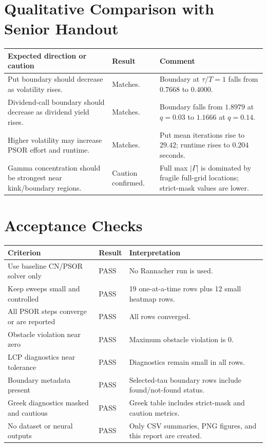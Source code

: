 \documentclass[11pt,a4paper]{article}
\begin{document}
\section{Qualitative Comparison with Senior Handout}

\begin{longtable}{L{0.34\textwidth} L{0.18\textwidth} L{0.34\textwidth}}
\toprule
Expected direction or caution & Result & Comment \\
\midrule
\endhead
Put boundary should decrease as volatility rises. & Matches. & Boundary at \(\tau/T=1\) falls from \(0.7668\) to \(0.4000\). \\
Dividend-call boundary should decrease as dividend yield rises. & Matches. & Boundary falls from \(1.8979\) at \(q=0.03\) to \(1.1666\) at \(q=0.14\). \\
Higher volatility may increase PSOR effort and runtime. & Matches. & Put mean iterations rise to \(29.42\); runtime rises to \(0.204\) seconds. \\
Gamma concentration should be strongest near kink/boundary regions. & Caution confirmed. & Full max \(|\Gamma|\) is dominated by fragile full-grid locations; strict-mask values are lower. \\
\bottomrule
\end{longtable}

\section{Acceptance Checks}

\begin{longtable}{L{0.42\textwidth} L{0.18\textwidth} L{0.28\textwidth}}
\toprule
Criterion & Result & Interpretation \\
\midrule
\endhead
Use baseline CN/PSOR solver only & PASS & No Rannacher run is used. \\
Keep sweeps small and controlled & PASS & 19 one-at-a-time rows plus 12 small heatmap rows. \\
All PSOR steps converge or are reported & PASS & All rows converged. \\
Obstacle violation near zero & PASS & Maximum obstacle violation is \(0\). \\
LCP diagnostics near tolerance & PASS & Diagnostics remain small in all rows. \\
Boundary metadata present & PASS & Selected-tau boundary rows include found/not-found status. \\
Greek diagnostics masked and cautious & PASS & Greek table includes strict-mask and caution metrics. \\
No dataset or neural outputs & PASS & Only CSV summaries, PNG figures, and this report are created. \\
\bottomrule
\end{longtable}
\end{document}
